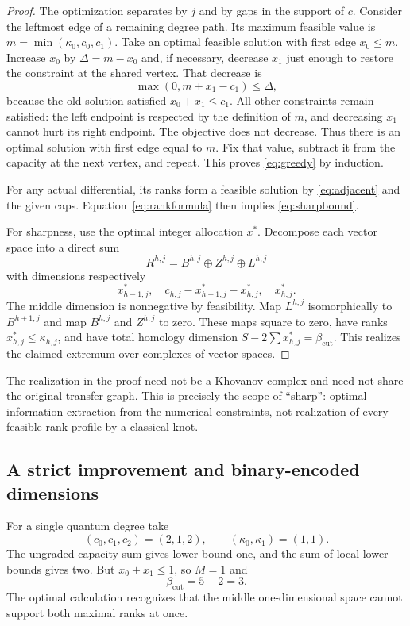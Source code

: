 \documentclass[11pt,letterpaper]{article}
\theoremstyle{definition}\newtheorem{definition}[theorem]{Definition}
\theoremstyle{remark}\newtheorem{remark}[theorem]{Remark}
\newcommand{\cutlb}{\beta_{\mathrm{cut}}}
\begin{document}
\begin{proof}
The optimization separates by $j$ and by gaps in the support of $c$.
Consider the leftmost edge of a remaining degree path. Its maximum feasible
value is $m=\min(\kappa_0,c_0,c_1)$. Take an optimal feasible solution with
first edge $x_0\leq m$. Increase $x_0$ by $\Delta=m-x_0$ and, if necessary,
decrease $x_1$ just enough to restore the constraint at the shared vertex.
That decrease is
\[
\max(0,m+x_1-c_1)\leq\Delta,
\]
because the old solution satisfied $x_0+x_1\leq c_1$.
All other constraints remain satisfied: the left endpoint is respected by
the definition of $m$, and decreasing $x_1$ cannot hurt its right endpoint.
The objective does not decrease. Thus there is an optimal solution with
first edge equal to $m$. Fix that value, subtract it from the capacity at
the next vertex, and repeat. This proves \eqref{eq:greedy} by induction.

For any actual differential, its ranks form a feasible solution by
\eqref{eq:adjacent} and the given caps. Equation~\eqref{eq:rankformula}
then implies \eqref{eq:sharpbound}.

For sharpness, use the optimal integer allocation $x^*$. Decompose each
vector space into a direct sum
\[
R^{h,j}=B^{h,j}\oplus Z^{h,j}\oplus L^{h,j}
\]
with dimensions respectively
\[
x^*_{h-1,j},\quad c_{h,j}-x^*_{h-1,j}-x^*_{h,j},\quad x^*_{h,j}.
\]
The middle dimension is nonnegative by feasibility. Map $L^{h,j}$
isomorphically to $B^{h+1,j}$ and map $B^{h,j}$ and $Z^{h,j}$ to zero.
These maps square to zero, have ranks $x^*_{h,j}\leq\kappa_{h,j}$,
and have total homology dimension $S-2\sum x^*_{h,j}=\cutlb$.
This realizes the claimed extremum over complexes of vector spaces.
\end{proof}

The realization in the proof need not be a Khovanov complex and need not
share the original transfer graph. This is precisely the scope of
``sharp'': optimal information extraction from the numerical constraints,
not realization of every feasible rank profile by a classical knot.

\subsection{A strict improvement and binary-encoded dimensions}
For a single quantum degree take
\[
(c_0,c_1,c_2)=(2,1,2),\qquad(\kappa_0,\kappa_1)=(1,1).
\]
The ungraded capacity sum gives lower bound one, and the sum of local lower
bounds gives two. But $x_0+x_1\leq1$, so $M=1$ and
\[
\cutlb=5-2=3.
\]
The optimal calculation recognizes that the middle one-dimensional space
cannot support both maximal ranks at once.
\end{document}
